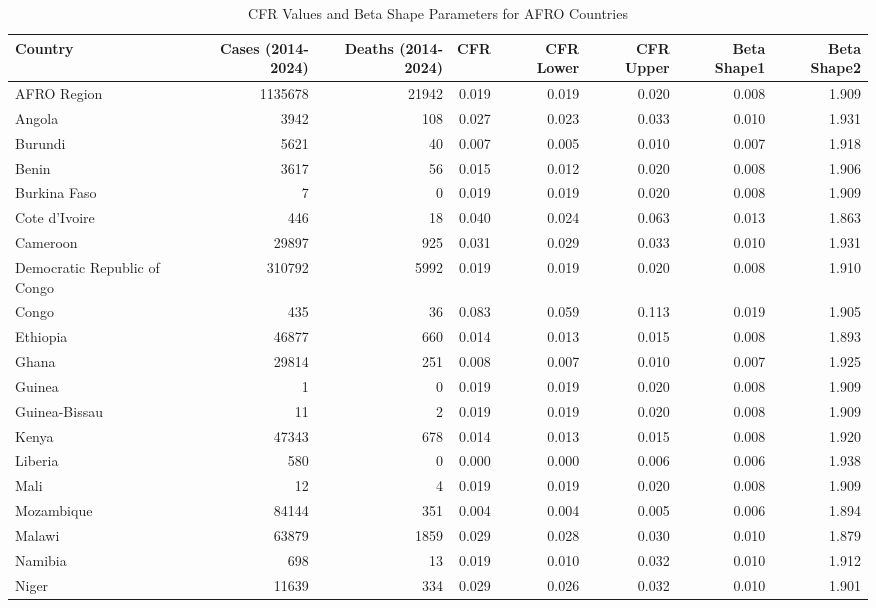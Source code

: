 \documentclass[
]{book}
\begin{document}
\begin{table}
\centering
\caption{\label{tab:cfr}CFR Values and Beta Shape Parameters for AFRO Countries}
\centering
\begin{tabular}[t]{l|r|r|r|r|r|r|r}
\hline
Country & Cases (2014-2024) & Deaths (2014-2024) & CFR & CFR Lower & CFR Upper & Beta Shape1 & Beta Shape2\\
\hline
AFRO Region & 1135678 & 21942 & 0.019 & 0.019 & 0.020 & 0.008 & 1.909\\
\hline
Angola & 3942 & 108 & 0.027 & 0.023 & 0.033 & 0.010 & 1.931\\
\hline
Burundi & 5621 & 40 & 0.007 & 0.005 & 0.010 & 0.007 & 1.918\\
\hline
Benin & 3617 & 56 & 0.015 & 0.012 & 0.020 & 0.008 & 1.906\\
\hline
Burkina Faso & 7 & 0 & 0.019 & 0.019 & 0.020 & 0.008 & 1.909\\
\hline
Cote d'Ivoire & 446 & 18 & 0.040 & 0.024 & 0.063 & 0.013 & 1.863\\
\hline
Cameroon & 29897 & 925 & 0.031 & 0.029 & 0.033 & 0.010 & 1.931\\
\hline
Democratic Republic of Congo & 310792 & 5992 & 0.019 & 0.019 & 0.020 & 0.008 & 1.910\\
\hline
Congo & 435 & 36 & 0.083 & 0.059 & 0.113 & 0.019 & 1.905\\
\hline
Ethiopia & 46877 & 660 & 0.014 & 0.013 & 0.015 & 0.008 & 1.893\\
\hline
Ghana & 29814 & 251 & 0.008 & 0.007 & 0.010 & 0.007 & 1.925\\
\hline
Guinea & 1 & 0 & 0.019 & 0.019 & 0.020 & 0.008 & 1.909\\
\hline
Guinea-Bissau & 11 & 2 & 0.019 & 0.019 & 0.020 & 0.008 & 1.909\\
\hline
Kenya & 47343 & 678 & 0.014 & 0.013 & 0.015 & 0.008 & 1.920\\
\hline
Liberia & 580 & 0 & 0.000 & 0.000 & 0.006 & 0.006 & 1.938\\
\hline
Mali & 12 & 4 & 0.019 & 0.019 & 0.020 & 0.008 & 1.909\\
\hline
Mozambique & 84144 & 351 & 0.004 & 0.004 & 0.005 & 0.006 & 1.894\\
\hline
Malawi & 63879 & 1859 & 0.029 & 0.028 & 0.030 & 0.010 & 1.879\\
\hline
Namibia & 698 & 13 & 0.019 & 0.010 & 0.032 & 0.010 & 1.912\\
\hline
Niger & 11639 & 334 & 0.029 & 0.026 & 0.032 & 0.010 & 1.901\\

\end{tabular}
\end{table}
\end{document}
